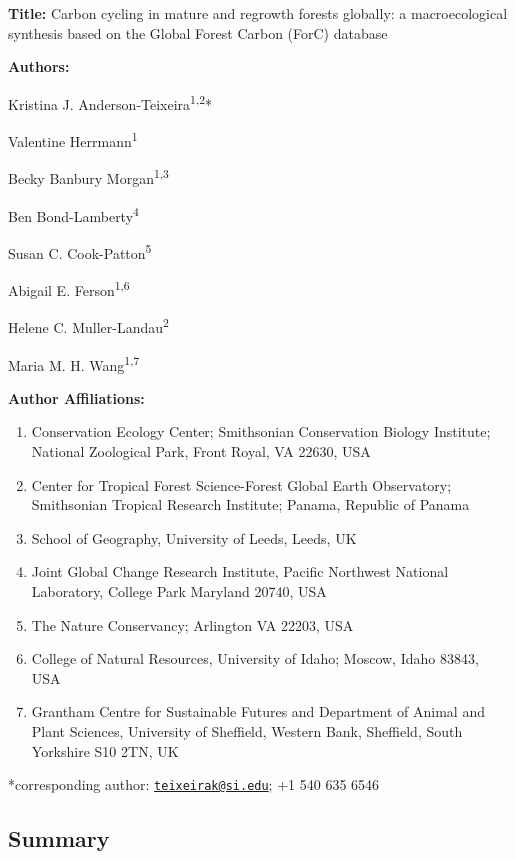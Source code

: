 \documentclass[
]{article}
\author{}
\date{\vspace{-2.5em}}
\providecommand{\tightlist}{%
  \setlength{\itemsep}{0pt}\setlength{\parskip}{0pt}}
\begin{document}
\raggedright

\textbf{Title:} Carbon cycling in mature and regrowth forests globally:
a macroecological synthesis based on the Global Forest Carbon (ForC)
database

\textbf{Authors:}

Kristina J. Anderson-Teixeira\textsuperscript{1,2}*

Valentine Herrmann\textsuperscript{1}

Becky Banbury Morgan\textsuperscript{1,3}

Ben Bond-Lamberty\textsuperscript{4}

Susan C. Cook-Patton\textsuperscript{5}

Abigail E. Ferson\textsuperscript{1,6}

Helene C. Muller-Landau\textsuperscript{2}

Maria M. H. Wang\textsuperscript{1,7}

\textbf{Author Affiliations:}

\begin{enumerate}
\def\labelenumi{\arabic{enumi}.}
\tightlist
\item
  Conservation Ecology Center; Smithsonian Conservation Biology
  Institute; National Zoological Park, Front Royal, VA 22630, USA
\item
  Center for Tropical Forest Science-Forest Global Earth Observatory;
  Smithsonian Tropical Research Institute; Panama, Republic of Panama
\item
  School of Geography, University of Leeds, Leeds, UK
\item
  Joint Global Change Research Institute, Pacific Northwest National
  Laboratory, College Park Maryland 20740, USA
\item
  The Nature Conservancy; Arlington VA 22203, USA
\item
  College of Natural Resources, University of Idaho; Moscow, Idaho
  83843, USA
\item
  Grantham Centre for Sustainable Futures and Department of Animal and
  Plant Sciences, University of Sheffield, Western Bank, Sheffield,
  South Yorkshire S10 2TN, UK
\end{enumerate}

*corresponding author:
\href{mailto:teixeirak@si.edu}{\nolinkurl{teixeirak@si.edu}}; +1 540 635
6546

\newpage

\hypertarget{summary}{%
\subsection{Summary}\label{summary}}
\end{document}
